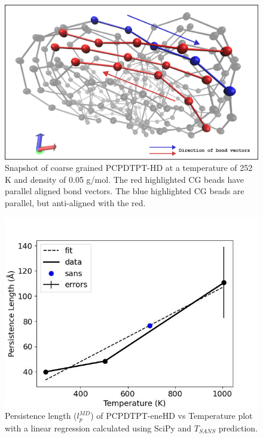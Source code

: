 \begin{figure}
    \centering
    \includegraphics[width=1\linewidth]{src/figures/pers_l_figs/real_cond_polymer.png}
    \caption{Snapshot of coarse grained PCPDTPT-HD at a temperature of 252 K and density of 0.05 g/mol. The red highlighted CG beads have parallel aligned bond vectors. The blue highlighted CG beads are parallel, but anti-aligned with the red.}
    \label{fig:real_cond_polymer}
\end{figure}


\begin{figure}
    \centering
    \includegraphics[width=1\linewidth]{src/figures/pers_l_figs/untitled folder/pcpdtpt/eneHD_plot.jpeg}
    \caption{Persistence length ($l_p^{MD}$) of PCPDTPT-eneHD vs Temperature plot with a linear regression calculated using SciPy \citep{2020SciPy-NMeth} and $T_{SANS}$ prediction.}
    \label{fig:eneHD_plot}
\end{figure}

